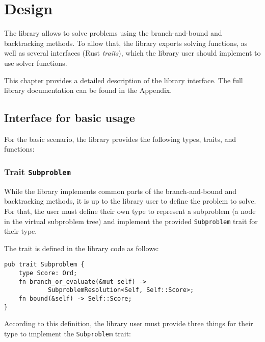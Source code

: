 \chapter{Design}
\label{chap:design}

The library allows to solve problems using the branch-and-bound and backtracking methods.
To allow that, the library exports solving functions, as well as several interfaces
(Rust \emph{traits}), which the library user should implement to use solver functions.

This chapter provides a detailed description of the library interface. The full library
documentation can be found in the Appendix.

\section{Interface for basic usage}

For the basic scenario, the library provides the following types, traits, and functions:

\subsection{Trait \texttt{Subproblem}}

While the library implements common parts of the branch-and-bound and backtracking methods,
it is up to the library user to define the problem to solve. For that, the user must define
their own type to represent a subproblem (a node in the virtual subproblem tree) and implement
the provided \texttt{Subproblem} trait for their type.

The trait is defined in the library code as follows:

\begin{lstlisting}[caption=Trait \texttt{Subproblem}]
pub trait Subproblem {
    type Score: Ord;
    fn branch_or_evaluate(&mut self) ->
            SubproblemResolution<Self, Self::Score>;
    fn bound(&self) -> Self::Score;
}
\end{lstlisting}

According to this definition, the library user must provide three things for their type to
implement the \texttt{Subproblem} trait:

